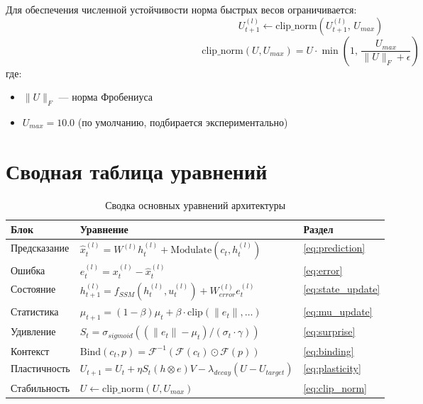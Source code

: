 Для обеспечения численной устойчивости норма быстрых весов ограничивается:
\begin{equation}
U_{t+1}^{(l)} \leftarrow \text{clip\_norm}\left(U_{t+1}^{(l)}, \, U_{max}\right)
\label{eq:weight_clip}
\end{equation}
\begin{equation}
\text{clip\_norm}(U, U_{max}) = U \cdot \min\left(1, \, \frac{U_{max}}{\|U\|_F + \epsilon}\right)
\label{eq:clip_norm}
\end{equation}
где:
\begin{itemize}
    \item $\|U\|_F$ — норма Фробениуса
    \item $U_{max} = 10.0$ (по умолчанию, подбирается экспериментально)
\end{itemize}

\section{Сводная таблица уравнений}

\begin{table}[h]
\centering
\caption{Сводка основных уравнений архитектуры}
\label{tab:equations_summary}
\begin{tabular}{lp{8cm}l}
\toprule
\textbf{Блок} & \textbf{Уравнение} & \textbf{Раздел} \\
\midrule
Предсказание & $\hat{x}_t^{(l)} = W^{(l)} h_t^{(l)} + \text{Modulate}(c_t, h_t^{(l)})$ & \ref{eq:prediction} \\
Ошибка & $e_t^{(l)} = x_t^{(l)} - \hat{x}_t^{(l)}$ & \ref{eq:error} \\
Состояние & $h_{t+1}^{(l)} = f_{SSM}(h_t^{(l)}, u_t^{(l)}) + W_{error}^{(l)} e_t^{(l)}$ & \ref{eq:state_update} \\
Статистика & $\mu_{t+1} = (1-\beta)\mu_t + \beta \cdot \text{clip}(\|e_t\|, \dots)$ & \ref{eq:mu_update} \\
Удивление & $S_t = \sigma_{sigmoid}((\|e_t\| - \mu_t)/(\sigma_t \cdot \gamma))$ & \ref{eq:surprise} \\
Контекст & $\text{Bind}(c_t, p) = \mathcal{F}^{-1}(\mathcal{F}(c_t) \odot \mathcal{F}(p))$ & \ref{eq:binding} \\
Пластичность & $U_{t+1} = U_t + \eta S_t (h \otimes e)V - \lambda_{decay}(U - U_{target})$ & \ref{eq:plasticity} \\
Стабильность & $U \leftarrow \text{clip\_norm}(U, U_{max})$ & \ref{eq:clip_norm} \\
\bottomrule
\end{tabular}
\end{table}

